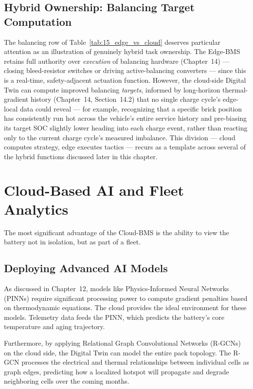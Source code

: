 \subsection{Hybrid Ownership: Balancing Target Computation}
\label{subsec:15_hybrid_ownership}

The balancing row of Table~\ref{tab:15_edge_vs_cloud} deserves particular attention as an illustration of genuinely hybrid task ownership. The Edge-BMS retains full authority over \emph{execution} of balancing hardware (Chapter~14) — closing bleed-resistor switches or driving active-balancing converters — since this is a real-time, safety-adjacent actuation function. However, the cloud-side Digital Twin can compute improved balancing \emph{targets}, informed by long-horizon thermal-gradient history (Chapter~14, Section~14.2) that no single charge cycle's edge-local data could reveal — for example, recognizing that a specific brick position has consistently run hot across the vehicle's entire service history and pre-biasing its target SOC slightly lower heading into each charge event, rather than reacting only to the current charge cycle's measured imbalance. This division — cloud computes strategy, edge executes tactics — recurs as a template across several of the hybrid functions discussed later in this chapter.

\section{Cloud-Based AI and Fleet Analytics}
\label{sec:15_fleet_analytics}

The most significant advantage of the Cloud-BMS is the ability to view the battery not in isolation, but as part of a fleet.

\subsection{Deploying Advanced AI Models}
\label{subsec:15_deploying_ai}

As discussed in Chapter~12, models like Physics-Informed Neural Networks (PINNs) require significant processing power to compute gradient penalties based on thermodynamic equations. The cloud provides the ideal environment for these models. Telemetry data feeds the PINN, which predicts the battery's core temperature and aging trajectory.

Furthermore, by applying Relational Graph Convolutional Networks (R-GCNs) on the cloud side, the Digital Twin can model the entire pack topology. The R-GCN processes the electrical and thermal relationships between individual cells as graph edges, predicting how a localized hotspot will propagate and degrade neighboring cells over the coming months.

